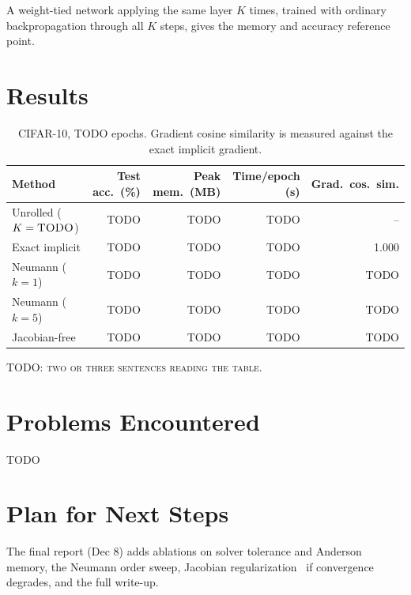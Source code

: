 \documentclass[11pt]{article}
\begin{document}
A weight-tied network applying the same layer $K$ times, trained with ordinary
backpropagation through all $K$ steps, gives the memory and accuracy reference
point.

\section{Results}

\begin{table}[h]
  \centering
  \caption{CIFAR-10, \textsc{TODO} epochs. Gradient cosine similarity is
    measured against the exact implicit gradient.}
  \begin{tabularx}{\textwidth}{@{}Xrrrr@{}}
    \toprule
    Method & Test acc.\ (\%) & Peak mem.\ (MB) & Time/epoch (s) & Grad.\ cos.\ sim. \\
    \midrule
    Unrolled ($K=\textsc{TODO}$) & \textsc{TODO} & \textsc{TODO} & \textsc{TODO} & -- \\
    Exact implicit & \textsc{TODO} & \textsc{TODO} & \textsc{TODO} & 1.000 \\
    Neumann ($k=1$) & \textsc{TODO} & \textsc{TODO} & \textsc{TODO} & \textsc{TODO} \\
    Neumann ($k=5$) & \textsc{TODO} & \textsc{TODO} & \textsc{TODO} & \textsc{TODO} \\
    Jacobian-free & \textsc{TODO} & \textsc{TODO} & \textsc{TODO} & \textsc{TODO} \\
    \bottomrule
  \end{tabularx}
  \label{tab:compare}
\end{table}


\textsc{TODO: two or three sentences reading the table.}

\section{Problems Encountered}

\textsc{TODO}

\section{Plan for Next Steps}

The final report (Dec 8) adds ablations on solver tolerance and Anderson
memory, the Neumann order sweep, Jacobian
regularization~\cite{bai2021stabilizing} if convergence degrades, and the full
write-up.

\printrefs
\end{document}
